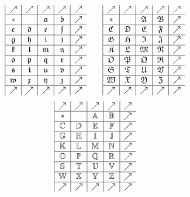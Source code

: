 \documentclass[11pt]{article}
\begin{document}
$$
\let\x\mathfrak
\begin{array}{|c|c|c|c|c}
\nearrow&\nearrow&\nearrow&\nearrow&\nearrow\\\hline
*&&\x a&\x b&\nearrow\\\hline
\x c&\x d&\x e&\x f&\nearrow\\\hline
\x g&\x h&\x i&\x j&\nearrow\\\hline
\x k&\x l&\x m&\x n&\nearrow\\\hline
\x o&\x p&\x q&\x r&\nearrow\\\hline
\x s&\x t&\x u&\x v&\nearrow\\\hline
\x w&\x x&\x y&\x z&\nearrow\\\hline
\nearrow&\nearrow&\nearrow&\nearrow&\nearrow
\end{array}
\qquad
\begin{array}{|c|c|c|c|c}
\nearrow&\nearrow&\nearrow&\nearrow&\nearrow\\\hline
*&&\x A&\x B&\nearrow\\\hline
\x C&\x D&\x E&\x F&\nearrow\\\hline
\x G&\x H&\x I&\x J&\nearrow\\\hline
\x K&\x L&\x M&\x N&\nearrow\\\hline
\x O&\x P&\x Q&\x R&\nearrow\\\hline
\x S&\x T&\x U&\x V&\nearrow\\\hline
\x W&\x X&\x Y&\x Z&\nearrow\\\hline
\nearrow&\nearrow&\nearrow&\nearrow&\nearrow
\end{array}
$$
$$
\let\x\mathbb
\begin{array}{|c|c|c|c|c}
\nearrow&\nearrow&\nearrow&\nearrow&\nearrow\\\hline
*&&\x A&\x B&\nearrow\\\hline
\x C&\x D&\x E&\x F&\nearrow\\\hline
\x G&\x H&\x I&\x J&\nearrow\\\hline
\x K&\x L&\x M&\x N&\nearrow\\\hline
\x O&\x P&\x Q&\x R&\nearrow\\\hline
\x S&\x T&\x U&\x V&\nearrow\\\hline
\x W&\x X&\x Y&\x Z&\nearrow\\\hline
\nearrow&\nearrow&\nearrow&\nearrow&\nearrow
\end{array}
$$
\end{document}
